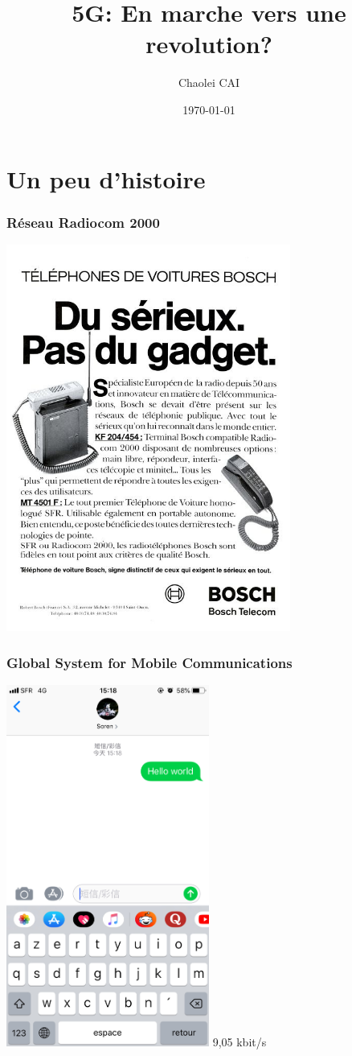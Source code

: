 \documentclass{beamer}
\subtitle{}
\title{5G: En marche vers une revolution?}
\institute[Paris 8]{Paris VIII}
\author{Chaolei CAI}
\date{\today}
\begin{document}
    \frame{\titlepage}
    \tableofcontents

    \section{Un peu d'histoire}

    \begin{frame}
        \frametitle{Réseau Radiocom 2000}
        \includegraphics[width=0.70\textwidth,height=0.9\textheight]{img/bosch.jpg}
    \end{frame}


    \begin{frame}
        \frametitle{Global System for Mobile Communications}
        \includegraphics[width=0.5\textwidth,height=0.9\textheight]{img/sms.jpg}
        9,05 kbit/s
    \end{frame}
\end{document}
